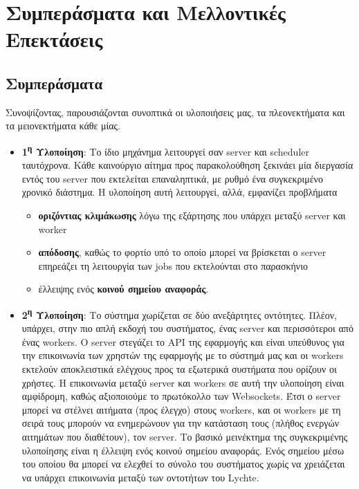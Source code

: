 \chapter{Συμπεράσματα και Μελλοντικές Επεκτάσεις}
\label{chapter:end}

\section{Συμπεράσματα}
\label{section:conclusion}

Συνοψίζοντας, παρουσιάζονται συνοπτικά οι υλοποιήσεις μας, τα πλεονεκτήματα και τα μειονεκτήματα κάθε μίας.

\begin{itemize}
	\item \textbf{1\textsuperscript{η} Υλοποίηση}: Το ίδιο μηχάνημα λειτουργεί σαν server και scheduler ταυτόχρονα.
		Κάθε καινούργιο αίτημα προς παρακολούθηση ξεκινάει μία διεργασία εντός του server που εκτελείται επαναληπτικά,
		με ρυθμό ένα συγκεκριμένο χρονικό διάστημα. Η υλοποίηση αυτή λειτουργεί, αλλά, εμφανίζει προβλήματα
		\begin{itemize}
			\item \textbf{οριζόντιας κλιμάκωσης} λόγω της εξάρτησης που υπάρχει μεταξύ server και worker
			\item \textbf{απόδοσης}, καθώς το φορτίο υπό το οποίο μπορεί να βρίσκεται ο server επηρεάζει τη λειτουργία των jobs που εκτελούνται στο παρασκήνιο 
			\item έλλειψης ενός \textbf{κοινού σημείου αναφοράς}.
		\end{itemize}
	\item \textbf{2\textsuperscript{η} Υλοποίηση}: Το σύστημα χωρίζεται σε δύο ανεξάρτητες οντότητες. Πλέον,
		υπάρχει, στην πιο απλή εκδοχή του συστήματος, ένας server και περισσότεροι από ένας workers. Ο server στεγάζει το API της εφαρμογής και είναι υπεύθυνος
		για την επικοινωνία των χρηστών της εφαρμογής με το σύστημά μας και οι workers εκτελούν αποκλειστικά ελέγχους προς
		τα εξωτερικά συστήματα που ορίζουν οι χρήστες. Η επικοινωνία μεταξύ server και workers σε αυτή την υλοποίηση είναι αμφίδρομη,
		καθώς αξιοποιούμε το πρωτόκολλο των Websockets. Έτσι ο server μπορεί να στέλνει αιτήματα (προς έλεγχο) στους workers,
		και οι workers με τη σειρά τους μπορούν να ενημερώνουν για την κατάσταση τους (πλήθος ενεργών αιτημάτων που διαθέτουν), τον server.
		Το βασικό μεινέκτημα της συγκεκριμένης υλοποίησης είναι η έλλειψη ενός κοινού σημείου αναφοράς. Ενός σημείου μέσω του οποίου
		θα μπορεί να ελεχθεί το σύνολο του συστήματος χωρίς να χρειάζεται να υπάρχει επικοινωνία μεταξύ των οντοτήτων του Lychte. 

\end{itemize}
